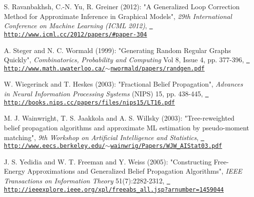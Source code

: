 \label{bibliography_RYG12}%
%
 S. Ravanbakhsh, C.-\/N. Yu, R. Greiner (2012)\+: "{}\+A Generalized Loop Correction Method for Approximate Inference in Graphical Models"{}, {\itshape 29th International Conference on Machine Learning (ICML 2012)}, \href{http://www.icml.cc/2012/papers/\#paper-304}{\texttt{ http\+://www.\+icml.\+cc/2012/papers/\#paper-\/304}}

\label{bibliography_StW99}%
%
 A. Steger and N. C. Wormald (1999)\+: "{}\+Generating Random Regular Graphs Quickly"{}, {\itshape Combinatorics, Probability and Computing} Vol 8, Issue 4, pp. 377-\/396, \href{http://www.math.uwaterloo.ca/~nwormald/papers/randgen.pdf}{\texttt{ http\+://www.\+math.\+uwaterloo.\+ca/\texorpdfstring{$\sim$}{\string~}nwormald/papers/randgen.\+pdf}}

\label{bibliography_WiH03}%
%
 W. Wiegerinck and T. Heskes (2003)\+: "{}\+Fractional Belief Propagation"{}, {\itshape Advances in Neural Information Processing Systems} (NIPS) 15, pp. 438-\/445, \href{http://books.nips.cc/papers/files/nips15/LT16.pdf}{\texttt{ http\+://books.\+nips.\+cc/papers/files/nips15/\+LT16.\+pdf}}

\label{bibliography_WJW03}%
%
 M. J. Wainwright, T. S. Jaakkola and A. S. Willsky (2003)\+: "{}\+Tree-\/reweighted belief propagation algorithms and approximate ML estimation by pseudo-\/moment matching"{}, {\itshape 9th Workshop on Artificial Intelligence and Statistics}, \href{http://www.eecs.berkeley.edu/~wainwrig/Papers/WJW_AIStat03.pdf}{\texttt{ http\+://www.\+eecs.\+berkeley.\+edu/\texorpdfstring{$\sim$}{\string~}wainwrig/\+Papers/\+WJW\+\_\+\+AIStat03.\+pdf}}

\label{bibliography_YFW05}%
%
 J. S. Yedidia and W. T. Freeman and Y. Weiss (2005)\+: "{}\+Constructing Free-\/\+Energy Approximations and Generalized Belief Propagation Algorithms"{}, {\itshape IEEE Transactions on Information Theory} 51(7)\+:2282-\/2312, \href{http://ieeexplore.ieee.org/xpl/freeabs_all.jsp?arnumber=1459044}{\texttt{ http\+://ieeexplore.\+ieee.\+org/xpl/freeabs\+\_\+all.\+jsp?arnumber=1459044}} 